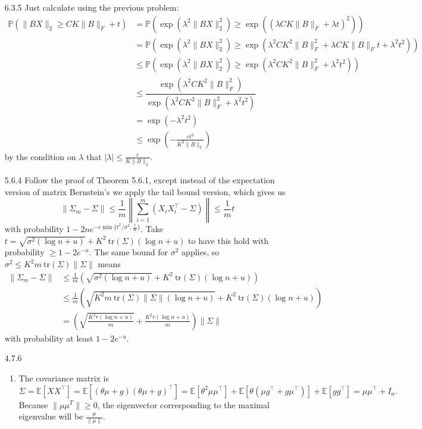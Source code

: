 \documentclass[11pt]{article}
\def\Pp{\mathbb P}
\def\E{\mathbb E}
\def\tr{\ensuremath{\ \text{tr}}}
\begin{document}
\begin{enumerate}
\begin{enumerate}
\end{enumerate}

\item[6.3.5] Just calculate using the previous problem:
\begin{align*}
	\Pp (\|BX\|_2 \geq CK \|B \|_F + t) &= \Pp (\exp(\lambda^2\|BX\|_2^2) \geq \exp{((\lambda CK \|B \|_F + \lambda t)^2)}) \\
	&= \Pp (\exp(\lambda^2\|BX\|_2^2) \geq \exp{(\lambda^2CK^2 \|B \|_F^2 + \lambda CK\|B\|_F t + \lambda^2t^2)}) \\
	&\leq \Pp (\exp(\lambda^2\|BX\|_2^2) \geq \exp{(\lambda^2CK^2 \|B \|_F^2 + \lambda^2t^2)}) \\
	&\leq \dfrac{\exp(\lambda^2CK^2 \|B \|_F^2)}{\exp{(\lambda^2CK^2 \|B \|_F^2 + \lambda^2t^2)}}\\
	&= \exp \left( -\lambda^2t^2 \right)\\
	&\leq \exp \left( -\frac{ct^2}{K^2\|B\|_2} \right)
\end{align*} 
by the condition on $ \lambda $ that $ |\lambda| \leq \frac{c}{K\| B \|_2} $.

\item[5.6.4] Follow the proof of Theorem 5.6.1, except instead of the expectation version of matrix Bernstein's we apply the tail bound version, which gives us
\[ \|\Sigma_m - \Sigma\| \leq \frac{1}{m} \left\|\sum_{i=1}^{m} (X_iX_i^\top - \Sigma) \right\| \leq \frac{1}{m} t  \]
with probability $ 1-2n e^{-c\min\{ t^2/\sigma^2, \frac{t}{K} \}} $. Take $ t=\sqrt{\sigma^2(\log n + u)} + K^2\tr(\Sigma)(\log n + u) $ to have this hold with probability $ \geq 1-2e^{-u} $. The same bound for $ \sigma^2 $ applies, so $ \sigma^2 \leq K^2 m \tr(\Sigma) \|\Sigma\| $ means
\begin{align*}
	\|\Sigma_m - \Sigma\| &\leq \frac{1}{m} \left( \sqrt{\sigma^2(\log n + u)} + K^2\tr(\Sigma)(\log n + u) \right)\\
&\leq \frac{1}{m} \left( \sqrt{K^2 m \tr(\Sigma) \|\Sigma\|(\log n + u)} + K^2\tr(\Sigma)(\log n + u) \right)\\
& = \left( \sqrt{\frac{K^2 r (\log n + u)}{m}} + \frac{K^2r(\log n + u)}{m} \right)\|\Sigma\|
\end{align*}
with probability at least $ 1-2e^{-u} $.

\item[4.7.6] \begin{enumerate}
	\item The covariance matrix is
	\[ \Sigma = \E[XX^\top] = \E[(\theta \mu + g)(\theta\mu + g)^\top] = \E[\theta^2\mu\mu^\top] + \E[\theta(\mu g^\top + g\mu^\top)] + \E[gg^\top] = \mu\mu^\top + I_n. \]
	Because $ \|\mu\mu^T\|\geq 0 $, the eigenvector corresponding to the maximal eigenvalue will be $ \frac{\mu}{\|\mu\|} $.
	

\end{enumerate}
\end{enumerate}
\end{document}
